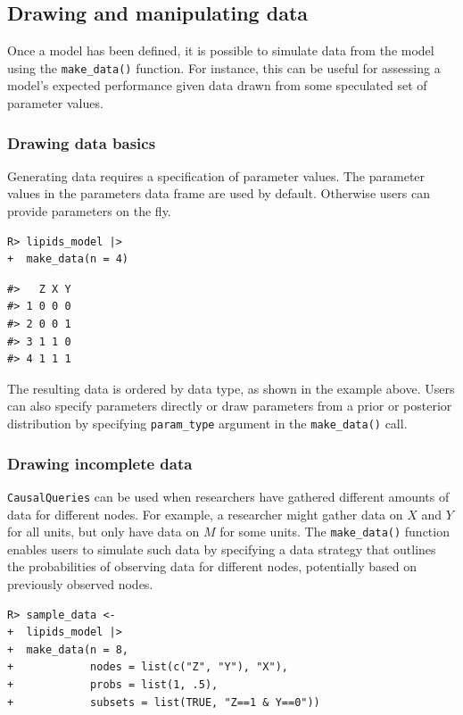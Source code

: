 \documentclass[
  11pt,
  article]{jss}
\begin{document}
\subsection{Drawing and manipulating
data}\label{drawing-and-manipulating-data}

Once a model has been defined, it is possible to simulate data from the
model using the \texttt{make\_data()} function. For instance, this can
be useful for assessing a model's expected performance given data drawn
from some speculated set of parameter values.

\subsubsection{Drawing data basics}\label{drawing-data-basics}

Generating data requires a specification of parameter values. The
parameter values in the parameters data frame are used by default.
Otherwise users can provide parameters on the fly.

\begin{verbatim}
R> lipids_model |> 
+  make_data(n = 4)
\end{verbatim}

\begin{verbatim}
#>   Z X Y
#> 1 0 0 0
#> 2 0 0 1
#> 3 1 1 0
#> 4 1 1 1
\end{verbatim}

The resulting data is ordered by data type, as shown in the example
above. Users can also specify parameters directly or draw parameters
from a prior or posterior distribution by specifying
\texttt{param\_type} argument in the \texttt{make\_data()} call.

\subsubsection{Drawing incomplete data}\label{drawing-incomplete-data}

\texttt{CausalQueries} can be used when researchers have gathered
different amounts of data for different nodes. For example, a researcher
might gather data on \(X\) and \(Y\) for all units, but only have data
on \(M\) for some units. The \texttt{make\_data()} function enables
users to simulate such data by specifying a data strategy that outlines
the probabilities of observing data for different nodes, potentially
based on previously observed nodes.

\begin{verbatim}
R> sample_data <-
+  lipids_model |>
+  make_data(n = 8,
+            nodes = list(c("Z", "Y"), "X"),
+            probs = list(1, .5),
+            subsets = list(TRUE, "Z==1 & Y==0"))
\end{verbatim}
\end{document}
